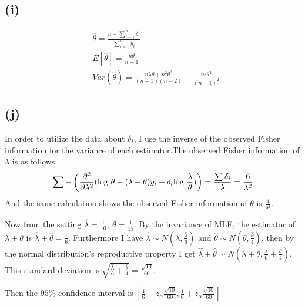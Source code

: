 \documentclass{article}
\begin{document}
\subsection{(i)}
\begin{align*}
	&\hat{\theta} = \frac{n - \sum_{i=1}^n \delta_i}{\sum_{i=1}^n y_i}\\[10pt]
	&E[\hat{\theta}] = \frac{n\theta}{n-1} \\[10pt]
	&Var(\hat{\theta}) = \frac{n\lambda\theta + n^2\theta^2}{(n-1)(n-2)} - \frac{n^2\theta^2}{(n-1)^2}
\end{align*}

\subsection{(j)}
In order to utilize the data about $\delta_i$, I use the inverse of the observed Fisher information for the variance of each estimator.The observed Fisher information of $\lambda$ is as follows.
\begin{align*}
	\sum -\left( \frac{\partial^2}{\partial \lambda^2} ({\rm log}\ \theta - (\lambda+\theta) y_i + \delta_i {\rm log}\ \frac{\lambda}{\theta}) \right) = \frac{\sum \delta_i}{\lambda} = \frac{6}{\lambda^2}
\end{align*}
And the same calculation shows the observed Fisher information of $\theta$ is $\frac{4}{\theta^2}$.
\par
Now from the setting $\hat{\lambda} = \frac{1}{10}, \ \hat{\theta} = \frac{1}{15}$. By the invariance of MLE, the estimator of $\lambda + \theta$ is $\hat{\lambda}+ \hat{\theta} = \frac{1}{6}$. Furthermore I have $\hat{\lambda} \sim N(\lambda, \frac{\hat{\lambda}}{6})$ and $\hat{\theta} \sim N(\theta, \frac{\hat{\theta}}{4})$, then by the normal distribution's reproductive property I get $\hat{\lambda}+ \hat{\theta} \sim N(\lambda+\theta, \frac{\hat{\lambda}}{6}+\frac{\hat{\theta}}{4})$. This standard deviation is $\sqrt{\frac{\hat{\lambda}}{6}+\frac{\hat{\theta}}{4}} = \frac{\sqrt{10}}{60}$.
\par
Then the $95\%$ confidence interval is $[\frac{1}{6} - z_{\alpha} \frac{\sqrt{10}}{60}, \frac{1}{6} + z_{\alpha} \frac{\sqrt{10}}{60}]$ 
\end{document}

